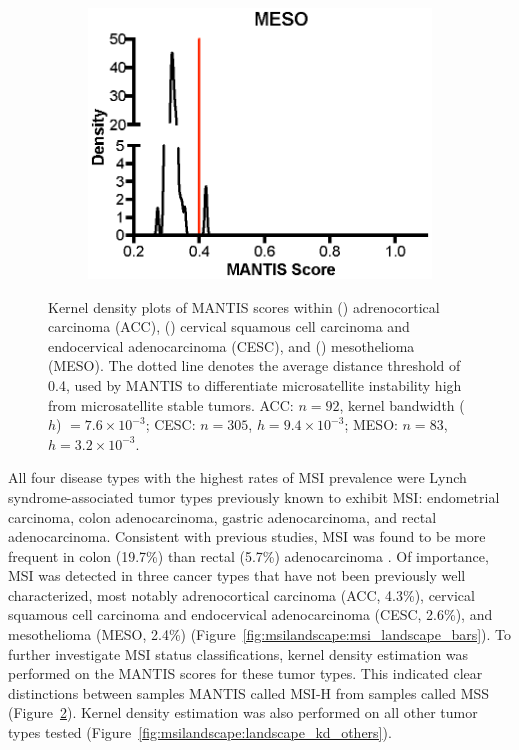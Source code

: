 \begin{figure}[ht]
\begin{subfigure}{0.33\textwidth}
		\includegraphics[width=\linewidth,keepaspectratio]{images/msilandscape/landscape_kd_meso}
		\caption{}\label{fig:msilandscape:landscape_kd_meso}
	\end{subfigure}
	\caption[Kernel density plots of MANTIS scores within ACC, CESC, and MESO.]{Kernel density plots of MANTIS scores within () adrenocortical carcinoma (ACC), () cervical squamous cell carcinoma and endocervical adenocarcinoma (CESC), and () mesothelioma (MESO)\@. The dotted line denotes the average distance threshold of 0.4, used by MANTIS to differentiate microsatellite instability high from microsatellite stable tumors. ACC: $n = 92$, kernel bandwidth ($h$) $= 7.6 \times 10^{-3}$; CESC: $n = 305$, $h = 9.4 \times 10^{-3}$; MESO: $n = 83$, $h = 3.2 \times 10^{-3}$.}
	\label{fig:msilandscape:landscape_kd_acc_cesc_meso}
\end{figure}
All four disease types with the highest rates of MSI prevalence were Lynch syndrome-associated tumor types previously known to exhibit MSI: endometrial carcinoma, colon adenocarcinoma, gastric adenocarcinoma, and rectal adenocarcinoma. Consistent with previous studies, MSI was found to be more frequent in colon (19.7\%) than rectal (5.7\%) adenocarcinoma \cite{hause2016,phipps2013}. Of importance, MSI was detected in three cancer types that have not been previously well characterized, most notably adrenocortical carcinoma (ACC, 4.3\%), cervical squamous cell carcinoma and endocervical adenocarcinoma (CESC, 2.6\%), and mesothelioma (MESO, 2.4\%) (Figure~\ref{fig:msilandscape:msi_landscape_bars}). To further investigate MSI status classifications, kernel density estimation \cite{parzen1962,davis2011} was performed on the MANTIS scores for these tumor types. This indicated clear distinctions between samples MANTIS called MSI-H from samples called MSS (Figure~\ref{fig:msilandscape:landscape_kd_acc_cesc_meso}). Kernel density estimation was also performed on all other tumor types tested (Figure~\ref{fig:msilandscape:landscape_kd_others}).

